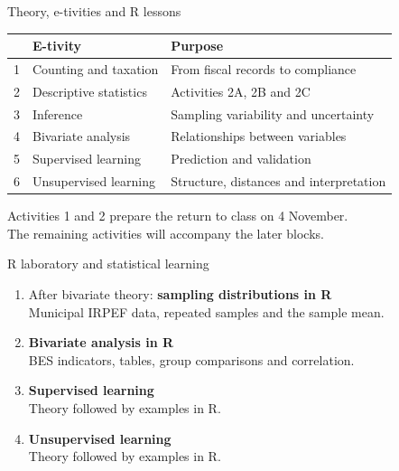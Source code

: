 \begin{frame}{Theory, e-tivities and R lessons}
\begin{tabular}{cl>{\raggedright\arraybackslash}p{}}\toprule
 & \textbf{E-tivity} & \textbf{Purpose}\\\midrule
1 & Counting and taxation & From fiscal records to compliance\\[2mm]
2 & Descriptive statistics & Activities 2A, 2B and 2C\\[2mm]
3 & Inference & Sampling variability and uncertainty\\[2mm]
4 & Bivariate analysis & Relationships between variables\\[2mm]
5 & Supervised learning & Prediction and validation\\[2mm]
6 & Unsupervised learning & Structure, distances and interpretation\\\bottomrule
\end{tabular}\par
\par\vspace{2mm}Activities 1 and 2 prepare the return to class on 4 November.\\
The remaining activities will accompany the later blocks.
\end{frame}

\begin{frame}{R laboratory and statistical learning}
\begin{enumerate}
\item After bivariate theory: \textbf{sampling distributions in R}\\Municipal IRPEF data, repeated samples and the sample mean.
\item \textbf{Bivariate analysis in R}\\BES indicators, tables, group comparisons and correlation.
\item \textbf{Supervised learning}\\Theory followed by examples in R.
\item \textbf{Unsupervised learning}\\Theory followed by examples in R.
\end{enumerate}
\end{frame}

